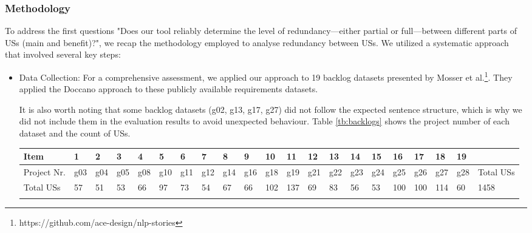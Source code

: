 \subsubsection*{Methodology}
To address the first questions "Does our tool reliably determine the level of redundancy—either partial or full—between different parts of USs (main and benefit)?", we recap the methodology employed to analyse redundancy between USs. We utilized a systematic approach that involved several key steps:
\begin{itemize}
	
	\item Data Collection: For a comprehensive assessment, we applied our approach to 19 backlog datasets presented by Mosser et al.\footnote{https://github.com/ace-design/nlp-stories}. They applied the Doccano approach to these publicly available requirements datasets\cite{requirementsdatasets}.
	
	It is also worth noting that some backlog datasets (g02, g13, g17, g27) did not follow the expected sentence structure, which is why we did not include them in the evaluation results to avoid unexpected behaviour. Table \ref{tb:backlogs} shows the project number of each dataset and the count of USs.
	
	\begingroup
	\centering
	\scriptsize
	\renewcommand{\arraystretch}{1.5} 
	\begin{tabularx}{\linewidth}{l|XXXXXXXXXXXXXXXXXXX|X}
		Item&	1&	2&	3&	4&	5&	6&	7&	8&	9&	10&	11&	12&	13&	14&	15&	16&	17&	18&	19&	\\
		\hline
		Project Nr.&	g03	&g04	&g05	&g08	&g10	&g11	&g12	&g14	&g16	&g18	&g19	&g21	&g22	&g23	&g24	&g25	&g26	&g27	&g28	&Total USs\\
		\hline
		Total USs&	57&	51	&53	&66	&97	&73	&54	&67	&66	&102	&137	&69	&83	&56	&53	&100	&100	&114	&60	&1458 \\
		\caption{Project number and count of USs contained in each backlog dataset}\label{tb:backlogs}
	\end{tabularx}	
	\endgroup
	

\end{itemize}
